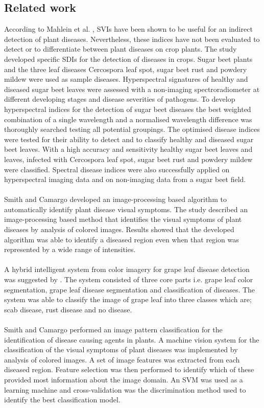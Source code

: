 \documentclass[conference]{IEEEtran}
\begin{document}
\subsection{Related work}
According to Mahlein et al. \cite{Mahlein201321}, \ac{SVIs} have been shown to be useful for an indirect detection of plant diseases. Nevertheless, these indices have not been evaluated to detect or to differentiate between plant diseases on crop plants. The study developed specific \ac{SDIs} for the detection of diseases in crops. Sugar beet plants and the three leaf diseases Cercospora leaf spot, sugar beet rust and powdery mildew were used as sample diseases. Hyperspectral signatures of healthy and diseased sugar beet leaves were assessed with a non-imaging spectroradiometer at different developing stages and disease severities of pathogens. To develop hyperspectral indices for the detection of sugar beet diseases the best weighted combination of a single wavelength and a normalised wavelength difference was thoroughly searched testing all potential groupings. The optimised disease indices were tested for their ability to detect and to classify healthy and diseased sugar beet leaves. With a high accuracy and sensitivity healthy sugar beet leaves and leaves, infected with Cercospora leaf spot, sugar beet rust and powdery mildew were classified. Spectral disease indices were also successfully applied on hyperspectral imaging data and on non-imaging data from a sugar beet field.\\ \\ Smith and Camargo \cite{Smith2009image} developed an image-processing based algorithm to automatically identify plant disease visual symptoms. The study described an image-processing based method that identifies the visual symptoms of plant diseases by analysis of colored images. Results showed that the developed algorithm was able to identify a diseased region even when that region was represented by a wide range of intensities.\\ \\ A hybrid intelligent system from color imagery for grape leaf disease detection was suggested by \cite{meunkaewjinda2008grape}. The system consisted of three core parts i.e. grape leaf color segmentation, grape leaf disease segmentation and classification of diseases. The system was able to classify the image of grape leaf into three classes which are; scab disease, rust disease and no disease.\\ \\ Smith and Camargo \cite{camargo2009image} performed an image pattern classification for the identification of disease causing agents in plants. A machine vision system for the classification of the visual symptoms of plant diseases was implemented by analysis of colored images. A set of image features was extracted from each diseased region. Feature selection was then performed to identify which of these provided most information about the image domain. An SVM was used as a learning machine and cross-validation was the discrimination method used to identify the best classification model.
\end{document}
